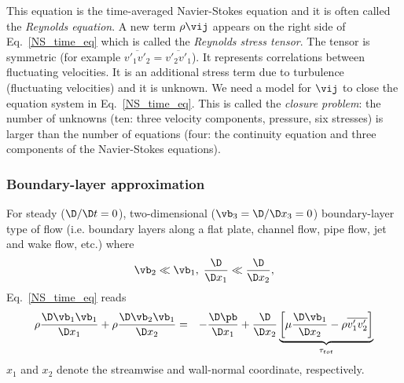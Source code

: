 \label{closure}
This equation is the time-averaged Navier-Stokes equation and it is often called
the \emph{Reynolds equation}.
A new term $\rho\vij$ appears on the right side of Eq.~\ref{NS_time_eq} which
is called the \emph{Reynolds stress tensor}. The tensor is symmetric
(for example $\overline{v'_1v'_2} = \overline{v'_2v'_1}$). It represents correlations
between fluctuating velocities. It is an additional stress term due to 
turbulence (fluctuating velocities) and it is unknown. We need a model
for $\vij$ to close the equation system in Eq.~\ref{NS_time_eq}.
This is called the \emph{closure problem}: the number of unknowns (ten:
 three velocity components, pressure, six stresses) is
larger than the number of equations (four: the continuity equation and
three components of the Navier-Stokes equations).

\subsubsection{Boundary-layer approximation}

For steady  ($\D /\D t=0$), two-dimensional ($\vb_3 = \D /\D x_3=0$) boundary-layer type of flow (i.e. boundary layers
along a flat plate, channel flow, pipe flow, jet and wake flow, etc.) where
%
\begin{eqnarray}
\label{bound_layer_approx_eq}
\vb_2 \ll \vb_1, \; \frac{\D}{\D x_1} \ll \frac{\D}{\D x_2},
\end{eqnarray}
%
Eq.~\ref{NS_time_eq} reads
%
\begin{eqnarray}
\label{NS_time_eq_b}
\rho \frac{\D \vb_1 \vb_1}{\D x_1} + \rho \frac{\D \vb_2 \vb_1}{\D x_2}  &=&
- \frac{\D \pb}{\D x_1} + \frac{\D}{\D x_2}\underbrace{ \left[\mu \frac{\D \vb_1}{\D x_2}
 - \rho \overline{v'_1v'_2}\right]}_{\tau_{tot}} 
\end{eqnarray}
%
$x_1$  and  $x_2$ denote
the streamwise and wall-normal coordinate, respectively.

